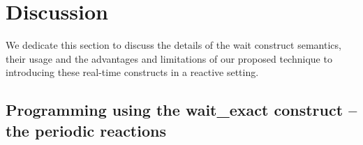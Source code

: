 \section{Discussion}
\label{sec:disc-perc-limit}

We dedicate this section to discuss the details of the wait construct
semantics, their usage and the advantages and limitations of our
proposed technique to introducing these real-time constructs in a
reactive setting.

\subsection{Programming using the wait\_exact construct -- the
  periodic reactions}
\label{sec:progr-using-delay}







